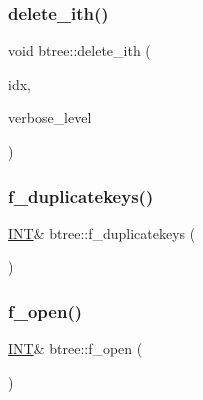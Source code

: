 \mbox{\label{classbtree_affb997b80633101c9ece9e436784e1e9}} 
\subsubsection{\texorpdfstring{delete\+\_\+ith()}{delete\_ith()}}
{\footnotesize\ttfamily void btree\+::delete\+\_\+ith (\begin{DoxyParamCaption}\item[{\mbox{\hyperlink{galois_8h_a09fddde158a3a20bd2dcadb609de11dc}{I\+NT}}}]{idx,  }\item[{\mbox{\hyperlink{galois_8h_a09fddde158a3a20bd2dcadb609de11dc}{I\+NT}}}]{verbose\+\_\+level }\end{DoxyParamCaption})}

\mbox{\label{classbtree_aa53430cc1a527debec6fe02f1c8a2bf5}} 
\subsubsection{\texorpdfstring{f\+\_\+duplicatekeys()}{f\_duplicatekeys()}}
{\footnotesize\ttfamily \mbox{\hyperlink{galois_8h_a09fddde158a3a20bd2dcadb609de11dc}{I\+NT}}\& btree\+::f\+\_\+duplicatekeys (\begin{DoxyParamCaption}{ }\end{DoxyParamCaption})\hspace{0.3cm}{\ttfamily [inline]}}

\mbox{\label{classbtree_a192d74607f02ea8e0ad631d6e6fd6704}} 
\subsubsection{\texorpdfstring{f\+\_\+open()}{f\_open()}}
{\footnotesize\ttfamily \mbox{\hyperlink{galois_8h_a09fddde158a3a20bd2dcadb609de11dc}{I\+NT}}\& btree\+::f\+\_\+open (\begin{DoxyParamCaption}{ }\end{DoxyParamCaption})\hspace{0.3cm}{\ttfamily [inline]}}

